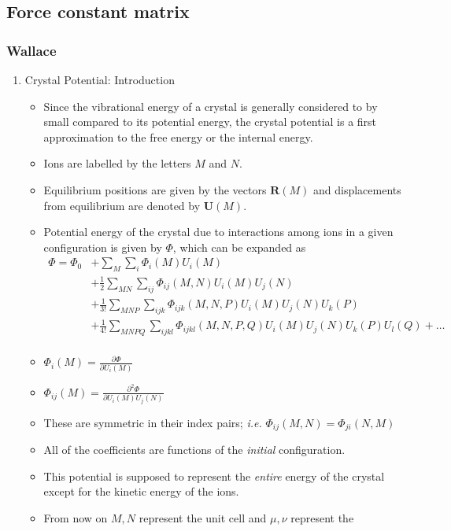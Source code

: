 \documentclass[11pt]{article}
\begin{document}
\subsection{Force constant matrix}
\label{sec-2-2}
\subsubsection{Wallace}
\label{sec-2-2-1}
\begin{enumerate}
\item Crystal Potential: Introduction
\label{sec-2-2-1-1}
\begin{itemize}
\item Since the vibrational energy of a crystal is generally considered to by
small compared to its potential energy, the crystal potential is a first
approximation to the free energy or the internal energy.
\item Ions are labelled by the letters $M$ and $N$.
\item Equilibrium positions are given by the vectors $\mathbf{R}(M)$ and
displacements from equilibrium are denoted by $\mathbf{U}(M)$.
\item Potential energy of the crystal due to interactions among ions in a
given configuration is given by $\Phi$, which can be expanded as
\begin{align}
\Phi = \Phi_{0} &+ \sum_{M}\sum_{i} \Phi_{i}(M)U_{i}(M) \\ 
     &+ \frac{1}{2}\sum_{MN}\sum_{ij}\Phi_{ij}(M,N)U_i(M)U_j(N)\\ 
     &+ \frac{1}{3!} \sum_{MNP}\sum_{ijk}\Phi_{ijk}(M,N,P)U_{i}(M)U_{j}(N)U_{k}(P) \\
     &+ \frac{1}{4!} \sum_{MNPQ}\sum_{ijkl}\Phi_{ijkl}(M,N,P,Q)U_{i}(M)U_{j}(N)U_{k}(P)U_{l}(Q) + \dots \\
\end{align}
\item $\Phi_{i}(M) = \frac{\partial \Phi}{\partial U_{i}(M)}$
\item $\Phi_{ij}(M) = \frac{\partial^{2} \Phi}{\partial U_{i}(M)U_{j}(N)}$
\item These are symmetric in their index pairs; \emph{i.e.} $\Phi_{ij}(M,N) = \Phi_{ji}(N,M)$
\item All of the coefficients are functions of the \emph{initial} configuration.
\item This potential is supposed to represent the \emph{entire} energy of the crystal
except for the kinetic energy of the ions.
\item From now on $M, N$ represent the unit cell and $\mu, \nu$ represent the

\end{itemize}
\end{enumerate}
\end{document}
